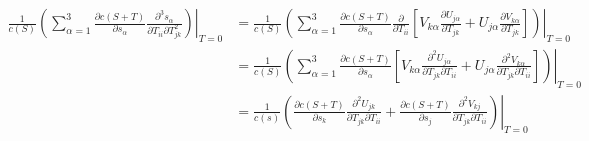 \documentclass[10pt]{article}
\begin{document}
\begin{align} \label{eqn:22}
	\frac{1}{c(S)}\left.\left( \sum_{\alpha=1}^3 \frac{\partial c(S+T)}{\partial s_\alpha} \frac{\partial^3 s_\alpha}{\partial T_{ii}\partial T^2_{jk}} \right)\right|_{T=0} &= \frac{1}{c(S)}\left.\left( \sum_{\alpha=1}^3 \frac{\partial c(S+T)}{\partial s_\alpha} \frac{\partial}{\partial T_{ii}} \left[ V_{k\alpha}\frac{\partial U_{j\alpha}}{\partial T_{jk}} + U_{j\alpha}\frac{\partial V_{k\alpha}}{\partial T_{jk}} \right] \right)\right|_{T=0} \nonumber \\
	&= \frac{1}{c(S)}\left.\left( \sum_{\alpha=1}^3 \frac{\partial c(S+T)}{\partial s_\alpha} \left[ V_{k\alpha}\frac{\partial^2 U_{j\alpha}}{\partial T_{jk} \partial T_{ii}} + U_{j\alpha}\frac{\partial^2 V_{k\alpha}}{\partial T_{jk} \partial T_{ii}} \right] \right)\right|_{T=0} \nonumber \\
	&= \frac{1}{c(s)} \left.\left( \frac{\partial c(S+T)}{\partial s_k}\frac{\partial^2 U_{jk}}{\partial T_{jk} \partial T_{ii}} + \frac{\partial c(S+T)}{\partial s_j} \frac{\partial^2 V_{kj}}{\partial T_{jk} \partial T_{ii}} \right)\right|_{T=0}
\end{align}
\end{document}
